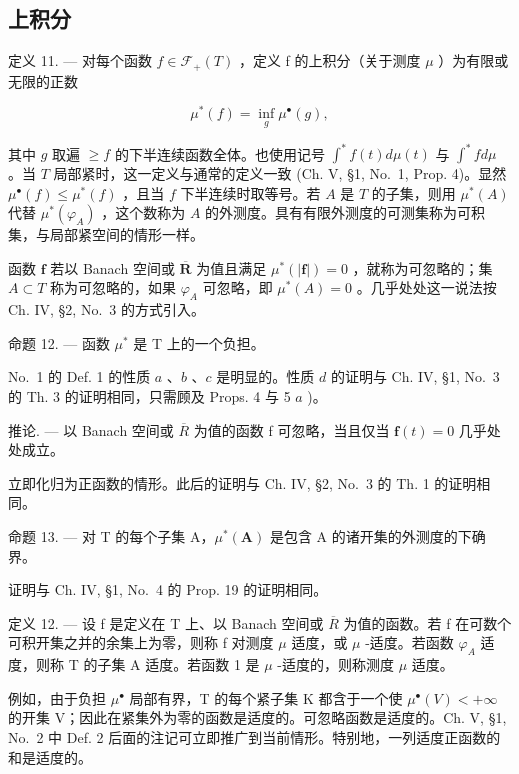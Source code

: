 \subsection{上积分}

定义 11. --- 对每个函数 \(f \in \mathcal{F}_{+}(T)\) ，定义 f 的上积分（关于测度 \(\mu\) ）为有限或无限的正数

\[
\mu^ {*} (f) = \inf _ {g} \mu^ {\bullet} (g),\tag{9}
\]

其中 \(g\) 取遍 \(\geqslant f\) 的下半连续函数全体。也使用记号 \(\int^{*} f(t) d\mu(t)\) 与 \(\int^{*} f d\mu\) 。当 \(T\) 局部紧时，这一定义与通常的定义一致 (Ch. V, §1, No.~1, Prop. 4)。显然 \(\mu^{\bullet}(f) \leqslant \mu^{*}(f)\) ，且当 \(f\) 下半连续时取等号。若 \(A\) 是 \(T\) 的子集，则用 \(\mu^{*}(A)\) 代替 \(\mu^{*}(\varphi_{A})\) ，这个数称为 \(A\) 的外测度。具有有限外测度的可测集称为可积集，与局部紧空间的情形一样。

函数 \(\mathbf{f}\) 若以 Banach 空间或 \(\overline{\mathbf{R}}\) 为值且满足 \(\mu^{*}(|\mathbf{f}|)=0\) ，就称为可忽略的；集 \(A\subset T\) 称为可忽略的，如果 \(\varphi_{A}\) 可忽略，即 \(\mu^{*}(A)=0\) 。几乎处处这一说法按 Ch. IV, §2, No.~3 的方式引入。

命题 12. --- 函数 \(\mu^{*}\) 是 T 上的一个负担。

No.~1 的 Def. 1 的性质 \(a\) 、\(b\) 、\(c\) 是明显的。性质 \(d\) 的证明与 Ch. IV, §1, No.~3 的 Th. 3 的证明相同，只需顾及 Props. 4 与 5 \(a\) )。

推论. --- 以 Banach 空间或 \(\overline{R}\) 为值的函数 f 可忽略，当且仅当 \(\mathbf{f}(t)=0\) 几乎处处成立。

立即化归为正函数的情形。此后的证明与 Ch. IV, §2, No.~3 的 Th. 1 的证明相同。

命题 13. --- 对 T 的每个子集 A，\(\mu^{*}(\mathbf{A})\) 是包含 A 的诸开集的外测度的下确界。

证明与 Ch. IV, §1, No.~4 的 Prop. 19 的证明相同。

定义 12. --- 设 f 是定义在 T 上、以 Banach 空间或 \(\overline{R}\) 为值的函数。若 f 在可数个可积开集之并的余集上为零，则称 f 对测度 \(\mu\) 适度，或 \(\mu\) -适度。若函数 \(\varphi_{A}\) 适度，则称 T 的子集 A 适度。若函数 1 是 \(\mu\) -适度的，则称测度 \(\mu\) 适度。

例如，由于负担 \(\mu^{\bullet}\) 局部有界，T 的每个紧子集 K 都含于一个使 \(\mu^{\bullet}(V)<+\infty\) 的开集 V；因此在紧集外为零的函数是适度的。可忽略函数是适度的。Ch. V, §1, No.~2 中 Def. 2 后面的注记可立即推广到当前情形。特别地，一列适度正函数的和是适度的。

